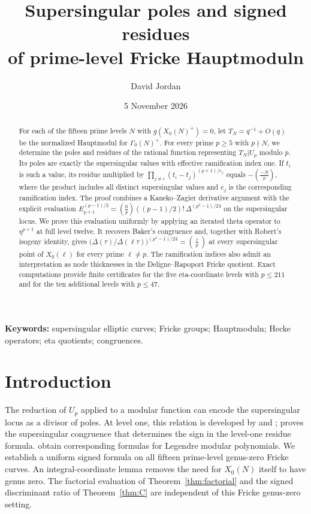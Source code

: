\documentclass[11pt,a4paper]{article}
\title{Supersingular poles and signed residues\\of prime-level Fricke Hauptmoduln}
\author{David Jordan}
\date{5 November 2026}
\numberwithin{equation}{section}
\theoremstyle{definition}
\theoremstyle{remark}
\begin{document}
\maketitle
\begin{abstract}
For each of the fifteen prime levels $N$ with $g(X_0(N)^+)=0$,
let $T_N=q^{-1}+O(q)$ be the normalized Hauptmodul for
$\Gamma_0(N)^+$. For every prime $p\ge5$ with $p\nmid N$, we determine the poles and
residues of the rational function representing $T_N|U_p$ modulo $p$. Its poles are
exactly the supersingular values with effective ramification index one. If $t_i$ is
such a value, its residue multiplied by
$\prod_{j\ne i}(t_i-t_j)^{(p+1)/e_j}$ equals $-\left(\frac{-N}{p}\right)$, where the
product includes all distinct supersingular values and $e_j$ is the corresponding
ramification index. The proof combines a Kaneko--Zagier derivative argument with
the explicit evaluation
$E_{p+1}^{(p-1)/2}=\left(\frac6p\right)((p-1)/2)!\,\Delta^{(p^2-1)/24}$
on the supersingular locus. We prove this evaluation uniformly by applying an
iterated theta operator to $\eta^{p+1}$ at full level twelve. It recovers Baker's
congruence and, together with Robert's isogeny identity, gives
$\bigl(\Delta(\tau)/\Delta(\ell\tau)\bigr)^{(p^2-1)/24}=\left(\frac{\ell}{p}\right)$
at every supersingular point of $X_0(\ell)$ for every prime $\ell\ne p$.
The ramification indices also admit an interpretation as node thicknesses in the
Deligne--Rapoport Fricke quotient. Exact computations provide finite certificates
for the five eta-coordinate levels with $p\le211$ and for the ten
additional levels with $p\le47$.
\end{abstract}
\noindent\textbf{Keywords:} supersingular elliptic curves; Fricke groups; Hauptmoduln; Hecke operators; eta quotients; congruences.

\section{Introduction}\label{sec:intro}
The reduction of $U_p$ applied to a modular function can encode the supersingular
locus as a divisor of poles. At level one, this relation is developed by \citet{dS94} and \citet[\S10]{KZ98}; \citet{Baker98} proves the
supersingular congruence that determines the sign in the level-one residue formula.
\citet{BL18} obtain corresponding formulas for Legendre modular
polynomials. We establish a uniform signed formula on all fifteen
prime-level genus-zero Fricke curves. An integral-coordinate lemma
removes the need for $X_0(N)$ itself to have genus zero. The factorial evaluation
of Theorem~\ref{thm:factorial} and the signed discriminant ratio of
Theorem~\ref{thm:C} are independent of this Fricke genus-zero setting.
\end{document}
